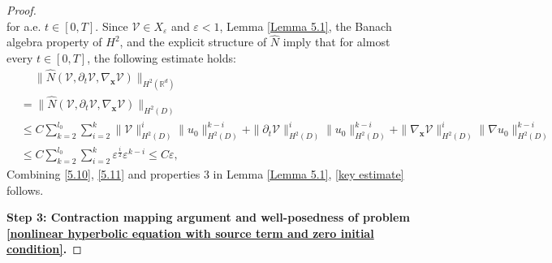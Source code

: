 \documentclass[11pt,reqno,oneside]{amsart}
\numberwithin{equation}{section}
\theoremstyle{definition}
\theoremstyle{remark}
\numberwithin{equation}{section}
\begin{document}
\begin{proof}
\begin{equation}
		\end{equation}
		for a.e. $t \in [0,T]$. Since \(\mathscr{V} \in X_\varepsilon\) and \(\varepsilon < 1\), Lemma \ref{Lemma 5.1}, the Banach algebra property of \(H^2\), and the explicit structure of \(\hat{N}\) imply that for almost every \(t \in [0,T]\), the following estimate holds:
		\begin{equation}\label{5.11}
			\begin{aligned}
				&\ \quad\|\hat{N}(\mathscr{V},\partial_{t}\mathscr{V},\nabla_\mathbf{x}\mathscr{V})\|_{H^2(\mathbb{R}^d)}\\
				&=\|\hat{N}(\mathscr{V},\partial_{t}\mathscr{V},\nabla_\mathbf{x}\mathscr{V})\|_{H^2(D)}\\
				&\leqslant C\sum_{k=2}^{l_0}\sum_{i=2}^{k}\|\mathscr{V}\|^{i}_{H^2(D)}\|u_0\|^{k-i}_{H^2(D)}+\|\partial_{t}\mathscr{V}\|^{i}_{H^2(D)}\|u_0\|^{k-i}_{H^2(D)}+\|\nabla_{\mathbf{x}}\mathscr{V}\|^{i}_{H^2(D)}\|\nabla u_0\|^{k-i}_{H^2(D)}\\
				&\leqslant C\sum_{k=2}^{l_0}\sum_{i=2}^{k}\varepsilon^{\frac{i}{2}}\varepsilon^{k-i} \leqslant C\varepsilon,
			\end{aligned}
		\end{equation}
		Combining \eqref{5.10}, \eqref{5.11} and properties 3 in Lemma \ref{Lemma 5.1}, \eqref{key estimate} follows.
		
		
		\medskip
		\textbf{Step 3: Contraction mapping argument and well-posedness of problem \ref{nonlinear hyperbolic equation with source term and zero initial condition}.}
		

\end{proof}
\end{document}
